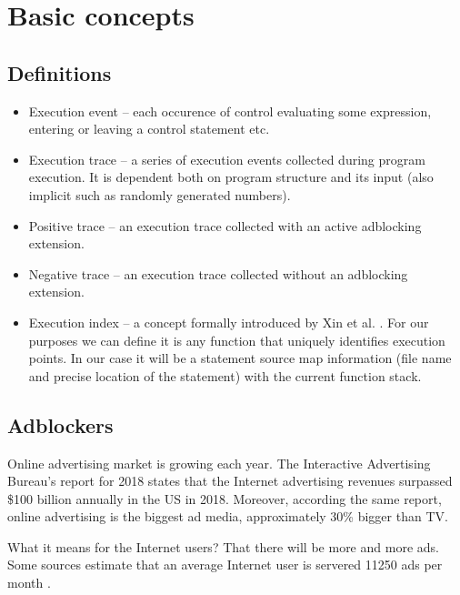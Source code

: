 \chapter{Basic concepts}

\section{Definitions}

\begin{itemize}
  \item Execution event -- each occurence of control evaluating some expression, entering or leaving a control statement etc.
  \item Execution trace -- a series of execution events collected during program execution. 
           It is dependent both on program structure and its input (also implicit such as randomly generated numbers).
  \item Positive trace -- an execution trace collected with an active adblocking extension.
  \item Negative trace -- an execution trace collected without an adblocking extension.
  \item Execution index -- a concept formally introduced by Xin et al. \cite{sigplan:execution-indexing}. 
                                         For our purposes we can define it is any function that uniquely identifies execution points. In our case it will
                                         be a statement source map information (file name and precise location of the statement) 
                                         with the current function stack.
\end{itemize}


\section{Adblockers}

Online advertising market is growing each year. The Interactive Advertising Bureau's report for 2018 \cite{iab:2018-report}
states that the Internet advertising revenues surpassed \$100 billion annually in the US in 2018. Moreover, according the same report,
online advertising is the biggest ad media, approximately 30\% bigger than TV.

What it means for the Internet users? That there will be more and more ads. 
Some sources estimate that an average Internet user is servered 11250 ads per month \cite{huff:too-many-ads}.

